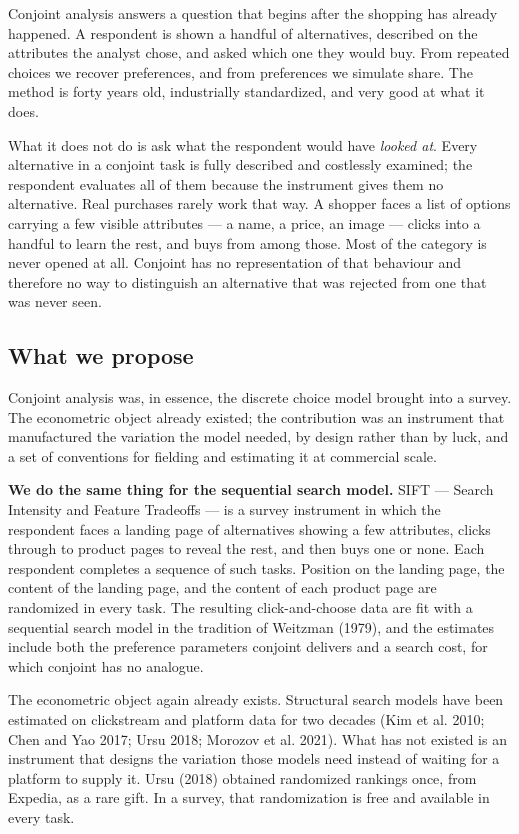 \documentclass[
  letterpaper,
  DIV=11,
  numbers=noendperiod]{scrartcl}
\newcounter{none} %
\begin{document}
Conjoint analysis answers a question that begins after the shopping has
already happened. A respondent is shown a handful of alternatives,
described on the attributes the analyst chose, and asked which one they
would buy. From repeated choices we recover preferences, and from
preferences we simulate share. The method is forty years old,
industrially standardized, and very good at what it does.

What it does not do is ask what the respondent would have \emph{looked
at}. Every alternative in a conjoint task is fully described and
costlessly examined; the respondent evaluates all of them because the
instrument gives them no alternative. Real purchases rarely work that
way. A shopper faces a list of options carrying a few visible attributes
--- a name, a price, an image --- clicks into a handful to learn the
rest, and buys from among those. Most of the category is never opened at
all. Conjoint has no representation of that behaviour and therefore no
way to distinguish an alternative that was rejected from one that was
never seen.

\subsection{What we propose}\label{what-we-propose}

Conjoint analysis was, in essence, the discrete choice model brought
into a survey. The econometric object already existed; the contribution
was an instrument that manufactured the variation the model needed, by
design rather than by luck, and a set of conventions for fielding and
estimating it at commercial scale.

\textbf{We do the same thing for the sequential search model.} SIFT ---
Search Intensity and Feature Tradeoffs --- is a survey instrument in
which the respondent faces a landing page of alternatives showing a few
attributes, clicks through to product pages to reveal the rest, and then
buys one or none. Each respondent completes a sequence of such tasks.
Position on the landing page, the content of the landing page, and the
content of each product page are randomized in every task. The resulting
click-and-choose data are fit with a sequential search model in the
tradition of Weitzman (1979), and the estimates include both the
preference parameters conjoint delivers and a search cost, for which
conjoint has no analogue.

The econometric object again already exists. Structural search models
have been estimated on clickstream and platform data for two decades
(Kim et al. 2010; Chen and Yao 2017; Ursu 2018; Morozov et al. 2021).
What has not existed is an instrument that designs the variation those
models need instead of waiting for a platform to supply it. Ursu (2018)
obtained randomized rankings once, from Expedia, as a rare gift. In a
survey, that randomization is free and available in every task.
\end{document}
